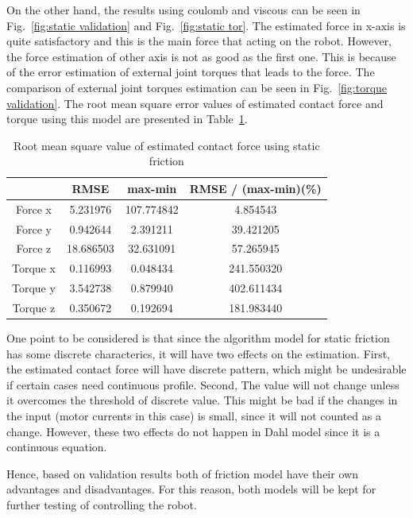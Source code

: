 \documentclass[letterpaper, 10 pt, conference]{ieeeconf}
\newcommand{\fref}[1]{Fig.~\ref{#1}}
\newcommand{\tref}[1]{Table~\ref{#1}}
\begin{document}
On the other hand, the results using coulomb and viscous can be seen in \fref{fig:static validation} and \fref{fig:static tor}. The estimated force in x-axis is quite satisfactory and this is the main force that acting on the robot. However, the force estimation of other axis is not as good as the first one. This is because of the error estimation of external joint torques that leads to the force. The comparison of external joint torques estimation can be seen in \fref{fig:torque validation}. The root mean square error values of estimated contact force and torque using this model are presented in \tref{table:rmse}.

\begin{table}
    \centering
    \begin{tabular}{| c | c | c | c |}
    \hline
              & RMSE & max-min & RMSE / (max-min)(\%) \\ \hline
    Force x   & 5.231976  & 107.774842  & 4.854543  \\ \hline
    Force y   & 0.942644  & 2.391211    & 39.421205  \\ \hline
    Force z   & 18.686503 & 32.631091   & 57.265945  \\ \hline
    Torque x  & 0.116993  & 0.048434    & 241.550320  \\ \hline
    Torque y  & 3.542738  & 0.879940    & 402.611434  \\ \hline
    Torque z  & 0.350672  & 0.192694    & 181.983440  \\ \hline
    \end{tabular}
    \caption{Root mean square value of estimated contact force using static friction}
    \label{table:rmse}
\end{table}

One point to be considered is that since the algorithm model for static friction has some discrete characterics, it will have two effects on the estimation. First, the estimated contact force will have discrete pattern, which might be undesirable if certain cases need continuous profile. Second, The value will not change unless it overcomes the threshold of discrete value. This might be bad if the changes in the input (motor currents in this case) is small, since it will not counted as a change. However, these two effects do not happen in Dahl model since it is a continuous equation.  

Hence, based on validation results both of friction model have their own advantages and disadvantages. For this reason, both models will be kept for further testing of controlling the robot. 
\end{document}
